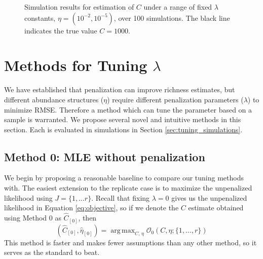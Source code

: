 \documentclass[oupdraft]{bio}
\DeclareMathOperator*{\argmax}{arg\,max}
\begin{document}
\begin{figure}[p]
\caption{Simulation results for estimation of $C$ under a range of fixed $\lambda$ constants, $\eta = (10^{-2}, 10^{-5})$, over 100 simulations.  The black line indicates the true value $C = 1000$.
\label{fig:fixed_lambda_2}}
\centering{}
\end{figure}


%
%
%
\section{Methods for Tuning $\lambda$}
\label{sec:tuning_proposals}

We have established that penalization can improve richness estimates, but different abundance structures ($\eta$) require different penalization parameters ($\lambda$) to minimize RMSE.  Therefore a method which can tune the parameter based on a sample is warranted.  We propose several novel and intuitive methods in this section.  Each is evaluated in simulations in Section \ref{sec:tuning_simulations}.  

\setcounter{subsection}{-1}
\subsection{Method 0: MLE without penalization}
We begin by proposing a reasonable baseline to compare our tuning methods with.
 The easiest extension to the replicate case is to maximize the unpenalized likelihood using $J = \{1, \dots r \}$.  Recall that fixing $\lambda = 0$ gives us the unpenalized likelihood in Equation \ref{eq:objective}, so if we denote the $C$ estimate obtained using Method 0 as $\widehat{C}_{[0]}$, then 
\begin{equation}
\left(\widehat{C}_{[0]},  \widehat{\eta}_{[0]} \right) = \argmax_{C, \, \eta}  \mathcal{O}_{0}\left(C, \eta ; \{1, \dots , r\} \right) \label{eq:c_hat_0}
\end{equation}
This method is faster and makes fewer assumptions than any other method, so it serves as the standard to beat.
\end{document}
